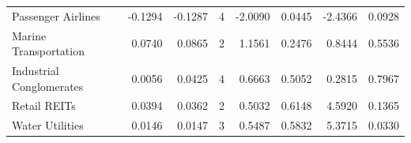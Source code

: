 \begin{table}
\begin{tabular}{lrrrrrrr}
Passenger Airlines & -0.1294 & -0.1287 & 4 & -2.0090 & 0.0445 & -2.4366 & 0.0928 \\
Marine Transportation & 0.0740 & 0.0865 & 2 & 1.1561 & 0.2476 & 0.8444 & 0.5536 \\
Industrial Conglomerates & 0.0056 & 0.0425 & 4 & 0.6663 & 0.5052 & 0.2815 & 0.7967 \\
Retail REITs & 0.0394 & 0.0362 & 2 & 0.5032 & 0.6148 & 4.5920 & 0.1365 \\
Water Utilities & 0.0146 & 0.0147 & 3 & 0.5487 & 0.5832 & 5.3715 & 0.0330 \\
\bottomrule
\end{tabular}
\end{table}
